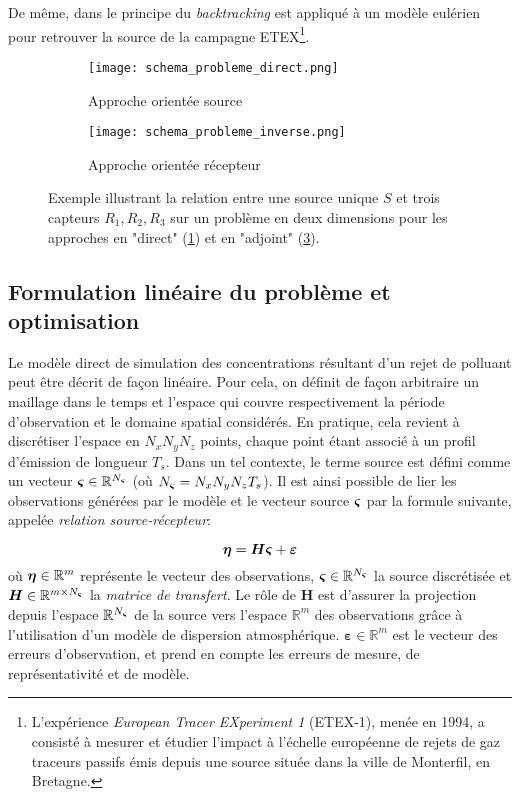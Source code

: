  \newpage De même, dans \cite{Hourdin2006b} le principe du \textit{backtracking} est appliqué à un modèle eulérien pour retrouver la source de la campagne ETEX\footnote{L’expérience \textit{European Tracer EXperiment 1} (ETEX-1), menée en 1994,  a consisté à mesurer et étudier l'impact à l'échelle européenne de rejets de gaz traceurs passifs émis depuis une source située dans la ville de Monterfil, en Bretagne.}.\\
 
 \begin{figure}[h!]
 	\begin{subfigure}{0.5\textwidth}
 		\texttt{[image: schema\_probleme\_direct.png]}
 		\caption{Approche orientée source}
 		\label{schema_probleme_direct}
 	\end{subfigure}
 	\begin{subfigure}{0.5\textwidth}
 		\texttt{[image: schema\_probleme\_inverse.png]}
 		\caption{Approche orientée récepteur}
 		\label{schema_probleme_inverse}
 	\end{subfigure}
 	\caption{Exemple illustrant la relation entre une source unique $S$ et trois capteurs $R_1,R_2,R_3$ sur un problème en deux dimensions pour les approches en "direct" (\ref{schema_probleme_direct}) et en "adjoint" (\ref{schema_probleme_inverse}). }
 \end{figure}

 
 \subsection{Formulation linéaire du problème et optimisation}
 \label{subsection_MCO}
 
Le modèle direct de simulation des concentrations résultant d'un rejet de polluant peut être décrit de façon linéaire. Pour cela, on définit de façon arbitraire un maillage dans le temps et l'espace qui couvre respectivement la période d'observation et le domaine spatial considérés. En pratique, cela revient à discrétiser l'espace en $N_xN_yN_z$ points, chaque point étant associé à un profil d'émission de longueur $T_s$. Dans un tel contexte, le terme source est défini comme un vecteur ${\bm{\varsigma}} \in \mathbb{R}^{N_{\bm{\varsigma}}}$ (où $N_{\bm{\varsigma}} = N_xN_yN_zT_s$). Il est ainsi possible de lier les observations générées par le modèle et le vecteur source ${\bm{\varsigma}}$ par la formule suivante, appelée \textit{relation source-récepteur}:

\begin{equation}
	\label{eq_relation_SR_non_parametrique}
	{\bm{\eta}} = \bm{H}{\bm{\varsigma}} + \bm{\varepsilon}
\end{equation}
où ${\bm{\eta}} \in \mathbb{R}^m$ représente le vecteur des observations, ${\bm{\varsigma}} \in \mathbb{R}^{N_{\bm{\varsigma}}}$ la source discrétisée et $\bm{H} \in \mathbb{R}^{m \times N_{\bm{\varsigma}}}$  la \textit{matrice de transfert}. Le rôle de $\bm{H}$ est d'assurer la projection depuis l'espace $\mathbb{R}^{N_{\bm{\varsigma}}}$  de la source vers l'espace $\mathbb{R}^m$ des observations grâce à l'utilisation d'un modèle de dispersion atmosphérique. $\bm{\varepsilon} \in \mathbb{R}^m$ est le vecteur des erreurs d'observation, et prend en compte les erreurs de mesure, de représentativité et de modèle. \\

